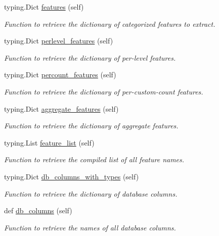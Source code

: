 \begin{DoxyCompactItemize}
typing.\+Dict \mbox{\hyperlink{classschemas_1_1_schema_1_1_schema_af82bbbdcbfcce5c877835fb72f011fd8}{features}} (self)
\begin{DoxyCompactList}\small\item\em Function to retrieve the dictionary of categorized features to extract. \end{DoxyCompactList}\item 
typing.\+Dict \mbox{\hyperlink{classschemas_1_1_schema_1_1_schema_aaa4cdb4eb5c81160ce964c035617471b}{perlevel\+\_\+features}} (self)
\begin{DoxyCompactList}\small\item\em Function to retrieve the dictionary of per-\/level features. \end{DoxyCompactList}\item 
typing.\+Dict \mbox{\hyperlink{classschemas_1_1_schema_1_1_schema_a9c47728a54d6f61550c665d83ecf142a}{percount\+\_\+features}} (self)
\begin{DoxyCompactList}\small\item\em Function to retrieve the dictionary of per-\/custom-\/count features. \end{DoxyCompactList}\item 
typing.\+Dict \mbox{\hyperlink{classschemas_1_1_schema_1_1_schema_a65c1e410bba5f9c14aa5f90558f1313f}{aggregate\+\_\+features}} (self)
\begin{DoxyCompactList}\small\item\em Function to retrieve the dictionary of aggregate features. \end{DoxyCompactList}\item 
typing.\+List \mbox{\hyperlink{classschemas_1_1_schema_1_1_schema_ac787b75fe46e2bbe10fd807bf76e1d0e}{feature\+\_\+list}} (self)
\begin{DoxyCompactList}\small\item\em Function to retrieve the compiled list of all feature names. \end{DoxyCompactList}\item 
typing.\+Dict \mbox{\hyperlink{classschemas_1_1_schema_1_1_schema_a8195db97a01c5a742d0a2734605acf82}{db\+\_\+columns\+\_\+with\+\_\+types}} (self)
\begin{DoxyCompactList}\small\item\em Function to retrieve the dictionary of database columns. \end{DoxyCompactList}\item 
def \mbox{\hyperlink{classschemas_1_1_schema_1_1_schema_a0441b3d86b6254c0b58d69053264ae56}{db\+\_\+columns}} (self)
\begin{DoxyCompactList}\small\item\em Function to retrieve the names of all database columns. \end{DoxyCompactList}\end{DoxyCompactItemize}
